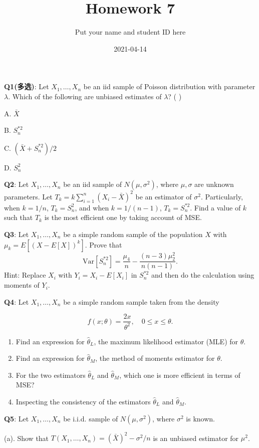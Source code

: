 \documentclass[]{article}
\title{Homework 7}
\author{Put your name and student ID here}
\date{2021-04-14}
\begin{document}
\maketitle

\textbf{Q1(多选)}: Let \(X_1,\dots,X_n\) be an iid sample of Poisson
distribution with parameter \(\lambda\). Which of the following are
unbiased estimates of \(\lambda\)? ( )

A. \(\bar X\)

B. \(S_n^{*2}\)

C. \((\bar X+S_n^{*2})/2\)

D. \(S_n^2\)

\textbf{Q2}: Let \(X_1,\dots,X_n\) be an iid sample of
\(N(\mu,\sigma^2)\), where \(\mu,\sigma\) are unknown parameters. Let
\(T_k=k\sum_{i=1}^n(X_i-\bar X)^2\) be an estimator of \(\sigma^2\).
Particularly, when \(k=1/n\), \(T_k=S_n^2\), and when \(k=1/(n-1)\),
\(T_k=S_n^{*2}\). Find a value of \(k\) such that \(T_k\) is the most
efficient one by taking account of MSE.

\textbf{Q3}: Let \(X_1,\dots,X_n\) be a simple random sample of the
population \(X\) with \(\mu_k = E[(X-E[X])^k]\). Prove that
\[\mathrm{Var}[S_n^{*2}]= \frac{\mu_4}{n}-\frac{(n-3)\mu_2^2}{n(n-1)}.\]
Hint: Replace \(X_i\) with \(Y_i=X_i-E[X_i]\) in \(S_n^{*2}\) and then
do the calculation using moments of \(Y_i\).

\textbf{Q4}: Let \(X_1,\dots,X_n\) be a simple random sample taken from
the density

\[f(x;\theta)=\frac{2x}{\theta^2},\quad 0\le x\le \theta.\]

\begin{enumerate}
\def\labelenumi{\arabic{enumi}.}
\item
  Find an expression for \(\hat\theta_L\), the maximum likelihood
  estimator (MLE) for \(\theta\).
\item
  Find an expression for \(\hat\theta_M\), the method of moments
  estimator for \(\theta\).
\item
  For the two estimators \(\hat\theta_L\) and \(\hat\theta_M\), which
  one is more efficient in terms of MSE?
\item
  Inspecting the consistency of the estimators \(\hat\theta_L\) and
  \(\hat\theta_M\).
\end{enumerate}

\textbf{Q5}: Let \(X_1,\dots,X_n\) be i.i.d. sample of
\(N(\mu,\sigma^2)\), where \(\sigma^2\) is known.

(a). Show that \(T(X_1,\dots,X_n) = (\bar X)^2-\sigma^2/n\) is an
unbiased estimator for \(\mu^2\).
\end{document}
